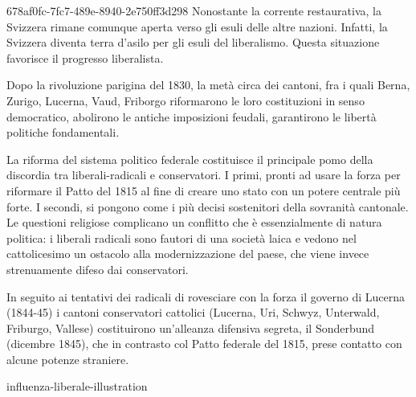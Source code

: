 \documentclass[preview]{standalone}
\begin{document}
\begin{snippet}{678af0fc-7fc7-489e-8940-2e750ff3d298}
    Nonostante la corrente restaurativa, la Svizzera rimane
    comunque aperta verso gli esuli delle altre nazioni.
    Infatti, la Svizzera diventa terra d'asilo per gli esuli del liberalismo.
    Questa situazione favorisce il progresso liberalista.
    
    Dopo la rivoluzione parigina del 1830, la metà circa dei cantoni, fra i quali Berna, Zurigo,
    Lucerna, Vaud, Friborgo riformarono le loro costituzioni in senso democratico,
    abolirono le antiche imposizioni feudali, garantirono le libertà politiche fondamentali.
    
    La riforma del sistema politico federale costituisce il principale pomo della discordia
    tra liberali-radicali e conservatori. I primi, pronti ad usare la forza per riformare il Patto
    del 1815 al fine di creare uno stato con un potere centrale più forte. I secondi, si
    pongono come i più decisi sostenitori della sovranità cantonale. Le questioni religiose
    complicano un conflitto che è essenzialmente di natura politica: i liberali radicali sono
    fautori di una società laica e vedono nel cattolicesimo un ostacolo alla modernizzazione
    del paese, che viene invece strenuamente difeso dai conservatori.
    
    In seguito ai tentativi dei radicali di rovesciare con la forza il governo di Lucerna (1844-45)
    i cantoni conservatori cattolici (Lucerna, Uri, Schwyz, Unterwald, Friburgo, Vallese)
    costituirono un'alleanza difensiva segreta, il Sonderbund (dicembre 1845), che in
    contrasto col Patto federale del 1815, prese contatto con alcune potenze straniere.
\end{snippet}

\begin{snippet}{influenza-liberale-illustration}
    \begin{center}
    \end{center}
\end{snippet}
\end{document}
